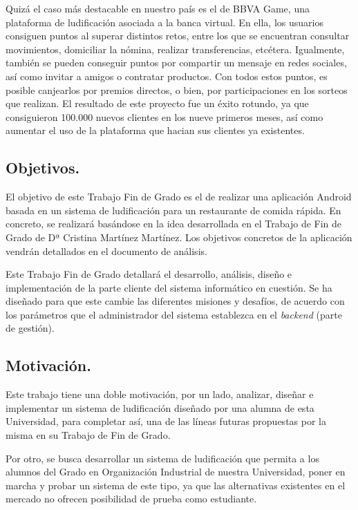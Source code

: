 \documentclass[twoside]{report}
\begin{document}
Quizá el caso más destacable en nuestro país es el de BBVA Game\cite{bbvag}, una plataforma de ludificación asociada a la banca virtual. En ella, los usuarios consiguen puntos al superar distintos retos, entre los que se encuentran consultar movimientos, domiciliar la nómina, realizar transferencias, etcétera. Igualmente, también se pueden conseguir puntos por compartir un mensaje en redes sociales, así como invitar a amigos o contratar productos. Con todos estos puntos, es posible canjearlos por premios directos, o bien, por participaciones en los sorteos que realizan. El resultado de este proyecto fue un éxito rotundo, ya que consiguieron 100.000 nuevos clientes en los nueve primeros meses, así como aumentar el uso de la plataforma que hacian sus clientes ya existentes.

\subsection{Objetivos.}

El objetivo de este Trabajo Fin de Grado es el de realizar una aplicación Android basada en un sistema de ludificación para un restaurante de comida rápida. En concreto, se realizará basándose en la idea desarrollada en el Trabajo de Fin de Grado de Dª Cristina Martínez Martínez\cite{cristinatfg}. Los objetivos concretos de la aplicación vendrán detallados en el documento de análisis.

Este Trabajo Fin de Grado detallará el desarrollo, análisis, diseño e implementación de la parte cliente del sistema informático en cuestión. Se ha diseñado para que este cambie las diferentes misiones y desafíos, de acuerdo con los parámetros que el administrador del sistema establezca en el \textit{backend} (parte de gestión).

\subsection{Motivación.}

Este trabajo tiene una doble motivación, por un lado, analizar, diseñar e implementar un sistema de ludificación diseñado por una alumna de esta Universidad, para completar así, una de las líneas futuras propuestas por la misma en su Trabajo de Fin de Grado. 

Por otro, se busca desarrollar un sistema de ludificación que permita a los alumnos del Grado en Organización Industrial de nuestra Universidad, poner en marcha y probar un sistema de este tipo, ya que las alternativas existentes en el mercado no ofrecen posibilidad de prueba como estudiante.
\end{document}
